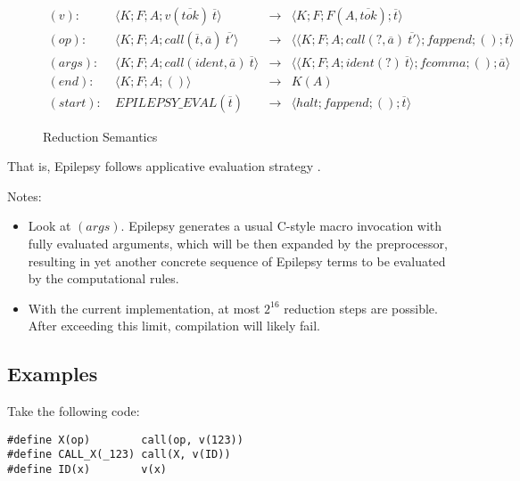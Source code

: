 \documentclass[12pt]{article}
\theoremstyle{break}
\begin{document}
\begin{figure}
    \caption{Reduction Semantics}

    \begin{align*}
        (v): \ & \langle K; F; A; v(\overline{tok}) \ \overline{t} \rangle & \to &
            \langle K; F; F(A, \overline{tok}); \overline{t} \rangle \\
        (op): \ & \langle K; F; A; call(\overline{t}, \overline{a}) \ \overline{t'} \rangle & \to &
            \langle \langle K; F; A; call(?, \overline{a}) \ \overline{t'} \rangle; fappend; (); \overline{t} \rangle \\
        (args): \ & \langle K; F; A; call(ident, \overline{a}) \ \overline{t} \rangle & \to
            & \langle \langle K; F; A; ident(?) \ \overline{t} \rangle; fcomma; (); \overline{a} \rangle \\
        (end): \ & \langle K; F; A; () \rangle & \to & K(A) \\
        (start): \ & EPILEPSY\_EVAL(\overline{t}) & \to &
            \langle halt; fappend; (); \overline{t} \rangle
    \end{align*}
    \label{ReductionSemantics}
\end{figure}

That is, Epilepsy follows applicative evaluation strategy \cite{ApplicativeEvaluationStrategy}.

Notes:

\begin{itemize}
    \item Look at $(args)$. Epilepsy generates a usual C-style macro invocation with
    fully evaluated arguments, which will be then expanded by the preprocessor, resulting
    in yet another concrete sequence of Epilepsy terms to be evaluated by the computational
    rules.
    \item With the current implementation, at most $2^{16}$ reduction steps are
    possible. After exceeding this limit, compilation will likely fail.
\end{itemize}

\subsection{Examples}

Take the following code:

\begin{verbatim}
#define X(op)        call(op, v(123))
#define CALL_X(_123) call(X, v(ID))
#define ID(x)        v(x)
\end{verbatim}
\end{document}

